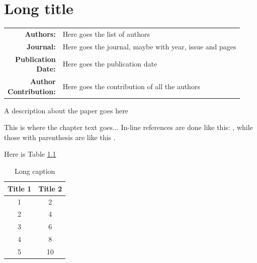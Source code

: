 \documentclass[../main.tex]{subfiles}
\begin{document}
\chapter[Short title]{Long title}
\label{cha:label} %

{\renewcommand{\arraystretch}{2.0} %
	\begin{table}[h]
		\begin{tabularx}{\textwidth}{>{\bfseries}r X}
			
			Authors: & Here goes the list of authors \\ 
			Journal: & Here goes the journal, maybe with year, issue and pages \\  
			\makecell[tr]{Publication \\ Date:} & Here goes the publication date \\
			\makecell[tr]{Author \\ Contribution:} & Here goes the contribution of all the authors \\
			
		\end{tabularx}
	\end{table}
}

A description about the paper goes here

\clearpage %
	
This is where the chapter text goes... In-line references are done like this: \citet{Horvath2011}, while those with parenthesis are like this \citep{Horvath2011}.

Here is Table \ref{ch2:tab:table1}

\begin{table}[t]
    
    \caption[Short caption]{Long caption}
    
    \label{ch2:tab:table1}

    \begin{tabular}{c c}
    
        \hline
    
         Title 1 & Title 2  \\
         
         \hline
         
         1       & 2        \\
         2       & 4        \\
         3       & 6        \\
         4       & 8        \\
         5       & 10       \\
         
         \hline
     
     
    \end{tabular}

\end{table}
\end{document}

